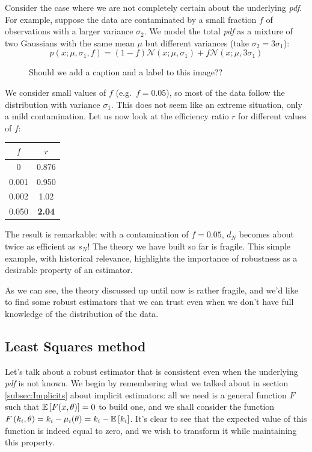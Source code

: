 \begin{example}
	Consider the case where we are not completely certain about the underlying \emph{pdf}. For example, suppose the data are contaminated by a small fraction $f$ of observations with a larger variance $\sigma_2$.
	We model the total \emph{pdf} as a mixture of two Gaussians with the same mean $\mu$ but different variances (take $\sigma_2 = 3\sigma_1$):
	\[
	p(x; \mu, \sigma_1, f) = (1-f)\mathcal{N}(x;\mu,\sigma_1) + f\mathcal{N}(x;\mu, 3\sigma_1)
	\]
	\begin{figure}[H]
		\centering
		
		\caption{Should we add a caption and a label to this image??}
	\end{figure}
	We consider small values of $f$ (e.g.\ $f=0.05$), so most of the data follow the distribution with variance $\sigma_1$. This does not seem like an extreme situation, only a mild contamination. Let us now look at the efficiency ratio $r$ for different values of $f$:
	\begin{center}
	\begin{tabular}{||c|c||}
		\hline
		$f$ & $r$ \\
		\hline
		0 & 0.876 \\
		\hline
		0.001 & 0.950\\
		\hline
		0.002 & 1.02\\
		\hline
		0.050 & \textbf{2.04}\\
		\hline
	\end{tabular}
	\end{center}
	The result is remarkable: with a contamination of $f=0.05$, $d_N$ becomes about twice as efficient as $s_N$! The theory we have built so far is fragile.
	This simple example, with historical relevance, highlights the importance of robustness as a desirable property of an estimator.
\end{example}

As we can see, the theory discussed up until now is rather fragile, and we'd like to find some robust estimators that we can trust even when we don't have full knowledge of the distribution of the data. 

\subsection{Least Squares method}
Let's talk about a robust estimator that is consistent even when the underlying \emph{pdf} is not known. We begin by remembering what we talked about in section \ref{subsec:Implicits} about implicit estimators: all we need is a general function $F$ such that $\mathbb{E}\left[F(x,\theta)\right] = 0$ to build one, and we shall consider the function $F\left(k_i,\theta\right) = k_i -\mu_i(\theta) = k_i - \mathbb{E}\left[k_i\right]$. It's clear to see that the expected value of this function is indeed equal to zero, and we wish to transform it while maintaining this property.

